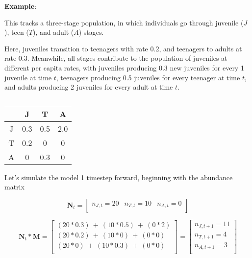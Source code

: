 \documentclass[12pt]{article}
\begin{document}
\textbf{Example}:

This tracks a three-stage population, in which individuals go through juvenile ($J$), teen ($T$), and adult ($A$) stages. 

Here, juveniles transition to teenagers with rate 0.2, and teenagers to adults at rate 0.3. Meanwhile, all stages contribute to the population of juveniles at different per capita rates, with juveniles producing 0.3 new juveniles for every 1 juvenile at time $t$, teenagers producing 0.5 juveniles for every teenager at time $t$, and adults producing 2 juveniles for every adult at time $t$. 



\begin{table}[h!]
\centering
\caption{}
\vspace{0.5cm}
\begin{tabular}{cccc}
& J & T & A \\
  \hline
J & 0.3  & 0.5  & 2.0 \\
T & 0.2  & 0    & 0   \\
A & 0    & 0.3  & 0 \\
\hline
\end{tabular}
\end{table}


Let's simulate the model 1 timestep forward, beginning with the abundance matrix 


\begin{equation*}
\mathbf{N}_{t}= \begin{bmatrix}
n_{J, t} = 20  & n_{T, t} = 10 & n_{A, t} = 0  \\
\end{bmatrix}
\end{equation*}




\begin{equation}
\mathbf{N}_{t} * \mathbf{M} = \begin{bmatrix}
(20 * 0.3) \ + \ (10 * 0.5) \ + \ (0 * 2)     \\
(20 * 0.2) \ + \ (10 * 0 ) \ + \ (0 * 0)    \\
(20 * 0 ) \ + \ (10 * 0.3) \ + \ (0 * 0)   \\
\end{bmatrix} = \begin{bmatrix}
n_{J, t+1} = 11 \\ 
n_{T, t+1} =  4 \\ 
n_{A, t+1} =  3 \\
\end{bmatrix}
\end{equation}
\end{document}
